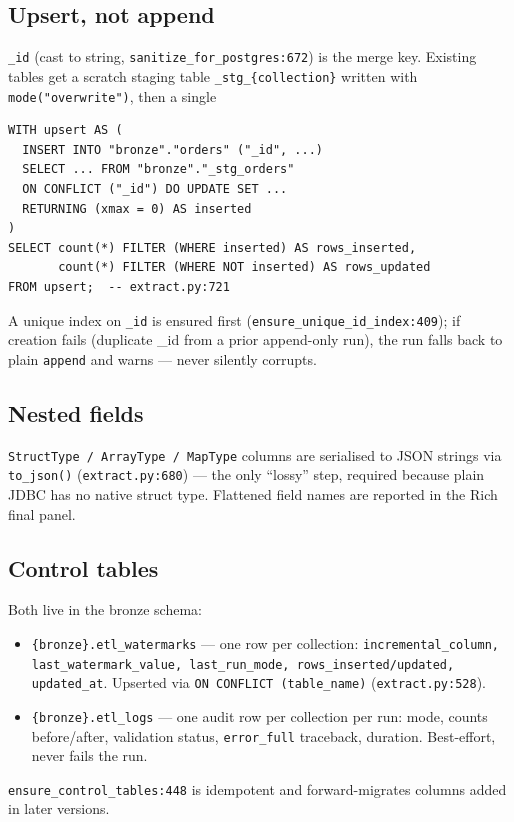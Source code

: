 \documentclass[11pt,a4paper]{article}
\begin{document}
\subsection{Upsert, not append}
\texttt{\_id} (cast to string, \texttt{sanitize\_for\_postgres:672}) is the merge key. Existing tables get a scratch staging table \texttt{\_stg\_\{collection\}} written with \texttt{mode("overwrite")}, then a single
\begin{lstlisting}[style=sql,caption={Merge — inserted vs updated via xmin}]
WITH upsert AS (
  INSERT INTO "bronze"."orders" ("_id", ...) 
  SELECT ... FROM "bronze"."_stg_orders"
  ON CONFLICT ("_id") DO UPDATE SET ... 
  RETURNING (xmax = 0) AS inserted
)
SELECT count(*) FILTER (WHERE inserted) AS rows_inserted,
       count(*) FILTER (WHERE NOT inserted) AS rows_updated
FROM upsert;  -- extract.py:721
\end{lstlisting}
A unique index on \texttt{\_id} is ensured first (\texttt{ensure\_unique\_id\_index:409}); if creation fails (duplicate \_id from a prior append-only run), the run falls back to plain \texttt{append} and warns — never silently corrupts.

\subsection{Nested fields}
\texttt{StructType / ArrayType / MapType} columns are serialised to JSON strings via \texttt{to\_json()} (\texttt{extract.py:680}) — the only ``lossy'' step, required because plain JDBC has no native struct type. Flattened field names are reported in the Rich final panel.

\subsection{Control tables}
Both live in the bronze schema:
\begin{itemize}[leftmargin=1.4em]
  \item \texttt{\{bronze\}.etl\_watermarks} — one row per collection: \texttt{incremental\_column, last\_watermark\_value, last\_run\_mode, rows\_inserted/updated, updated\_at}. Upserted via \texttt{ON CONFLICT (table\_name)} (\texttt{extract.py:528}).
  \item \texttt{\{bronze\}.etl\_logs} — one audit row per collection per run: mode, counts before/after, validation status, \texttt{error\_full} traceback, duration. Best-effort, never fails the run.
\end{itemize}
\texttt{ensure\_control\_tables:448} is idempotent and forward-migrates columns added in later versions.
\end{document}
